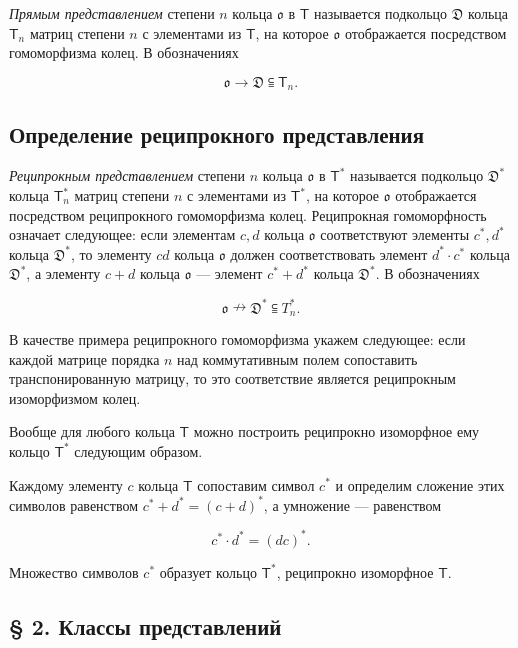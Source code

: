 \documentclass[11pt]{article}
\begin{document}
\emph{Прямым представлением} степени \(n\) кольца \(\mathfrak{o}\) в \(\mathsf T\) называется подкольцо \(\mathfrak D\) кольца \(\mathsf T_n\) матриц степени \(n\) с элементами из \(\mathsf T\), на которое \(\mathfrak{o}\) отображается посредством гомоморфизма колец. В обозначениях

\[
\mathfrak{o}\to\mathfrak D\subseteqq\mathsf T_n.
\]

\subsection*{Определение реципрокного представления}\label{definition-der-reziproken-darstellung}

\emph{Реципрокным представлением} степени \(n\) кольца \(\mathfrak{o}\) в \(\mathsf T^*\) называется подкольцо \(\mathfrak D^*\) кольца \(\mathsf T_n^*\) матриц степени \(n\) с элементами из \(\mathsf T^*\), на которое \(\mathfrak{o}\) отображается посредством реципрокного гомоморфизма колец. Реципрокная гомоморфность означает следующее: если элементам \(c,d\) кольца \(\mathfrak{o}\) соответствуют элементы \(c^*,d^*\) кольца \(\mathfrak D^*\), то элементу \(cd\) кольца \(\mathfrak{o}\) должен соответствовать элемент \(d^*\cdot c^*\) кольца \(\mathfrak D^*\), а элементу \(c+d\) кольца \(\mathfrak{o}\) --- элемент \(c^*+d^*\) кольца \(\mathfrak D^*\). В обозначениях

\[
\mathfrak{o}\nrightarrow\mathfrak D^*\subseteqq T_n^*.
\]

В качестве примера реципрокного гомоморфизма укажем следующее: если каждой матрице порядка \(n\) над коммутативным полем сопоставить транспонированную матрицу, то это соответствие является реципрокным изоморфизмом колец.

Вообще для любого кольца \(\mathsf T\) можно построить реципрокно изоморфное ему кольцо \(\mathsf T^*\) следующим образом.

Каждому элементу \(c\) кольца \(\mathsf T\) сопоставим символ \(c^*\) и определим сложение этих символов равенством \(c^*+d^*=(c+d)^*\), а умножение --- равенством

\[
c^*\cdot d^*=(dc)^*.
\]

Множество символов \(c^*\) образует кольцо \(\mathsf T^*\), реципрокно изоморфное \(\mathsf T\).

\subsection*{§ 2. Классы представлений}\label{darstellungsklassen}
\end{document}
